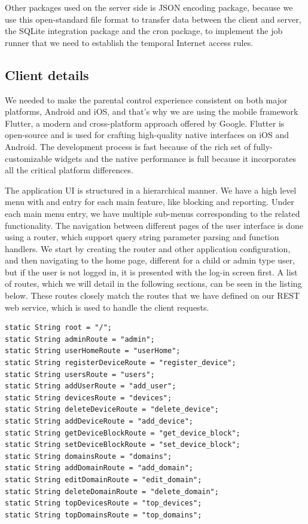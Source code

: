 Other packages used on the server side is JSON encoding package, because we use this open-standard file format to transfer data between the client and server, the SQLite integration package and the cron package, to implement the job runner that we need to establish the temporal Internet access rules.

\subsection{Client details}

We needed to make the parental control experience consistent on both major platforms, Android and iOS, and that's why we are using the mobile framework Flutter, a modern and cross-platform approach offered by Google. Flutter is open-source and is used for crafting high-quality native interfaces on iOS and Android. The development process is fast because of the rich set of fully-customizable widgets and the native performance is full because it incorporates all the critical platform differences.

The application UI is structured in a hierarchical manner. We have a high level menu with and entry for each main feature, like blocking and reporting. Under each main menu entry, we have multiple sub-menus corresponding to the related functionality. The navigation between different pages of the user interface is done using a router, which support query string parameter parsing and function handlers. We start by creating the router and other application configuration, and then navigating to the home page, different for a child or admin type user, but if the user is not logged in, it is presented with the log-in screen first. A list of routes, which we will detail in the following sections, can be seen in the listing below. These routes closely match the routes that we have defined on our REST web service, which is used to handle the client requests.

\begin{lstlisting}
static String root = "/";
static String adminRoute = "admin";
static String userHomeRoute = "userHome";
static String registerDeviceRoute = "register_device";
static String usersRoute = "users";
static String addUserRoute = "add_user";
static String devicesRoute = "devices";
static String deleteDeviceRoute = "delete_device";
static String addDeviceRoute = "add_device";
static String getDeviceBlockRoute = "get_device_block";
static String setDeviceBlockRoute = "set_device_block";
static String domainsRoute = "domains";
static String addDomainRoute = "add_domain";
static String editDomainRoute = "edit_domain";
static String deleteDomainRoute = "delete_domain";
static String topDevicesRoute = "top_devices";
static String topDomainsRoute = "top_domains";
\end{lstlisting}

